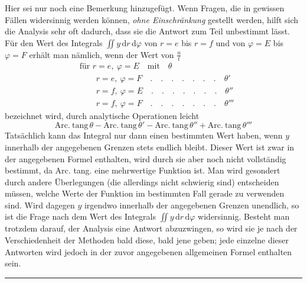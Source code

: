 Hier sei nur noch eine Bemerkung hinzugefügt. Wenn Fragen, die in gewissen Fällen widersinnig werden können, \textit{ohne Einschränkung} gestellt werden, hilft sich die Analysis sehr oft dadurch, dass sie die Antwort zum Teil unbestimmt lässt. Für den Wert des Integrals $\iint y\,\mathrm dr\,\mathrm d\varphi$ von $r=e$ bis $r=f$ und von $\varphi=E$ bis $\varphi=F$ erhält man nämlich, wenn der Wert von $\frac ut$
\[
\begin{aligned}
&\text{für }r=e,\ \varphi=E\quad\text{mit}\quad\theta\\
&\qquad r=e,\ \varphi=F\quad .\quad .\quad .\quad .\quad .\quad .\quad .\quad\theta'\\
&\qquad r=f,\ \varphi=E\quad .\quad .\quad .\quad .\quad .\quad .\quad .\quad\theta''\\
&\qquad r=f,\ \varphi=F\quad .\quad .\quad .\quad .\quad .\quad .\quad .\quad\theta'''
\end{aligned}
\]
bezeichnet wird, durch analytische Operationen leicht
\[
\mathrm{Arc.\ tang}\,\theta-\mathrm{Arc.\ tang}\,\theta'-\mathrm{Arc.\ tang}\,\theta''+\mathrm{Arc.\ tang}\,\theta'''
\]
Tatsächlich kann das Integral nur dann einen bestimmten Wert haben, wenn $y$ innerhalb der angegebenen Grenzen stets endlich bleibt. Dieser Wert ist zwar in der angegebenen Formel enthalten, wird durch sie aber noch nicht vollständig bestimmt, da Arc. tang. eine mehrwertige Funktion ist. Man wird gesondert durch andere Überlegungen (die allerdings nicht schwierig sind) entscheiden müssen, welche Werte der Funktion im bestimmten Fall gerade zu verwenden sind. Wird dagegen $y$ irgendwo innerhalb der angegebenen Grenzen unendlich, so ist die Frage nach dem Wert des Integrals $\iint y\,\mathrm dr\,\mathrm d\varphi$ widersinnig. Besteht man trotzdem darauf, der Analysis eine Antwort abzuzwingen, so wird sie je nach der Verschiedenheit der Methoden bald diese, bald jene geben; jede einzelne dieser Antworten wird jedoch in der zuvor angegebenen allgemeinen Formel enthalten sein.
\begin{center}\rule{3cm}{0.3pt}\end{center}
